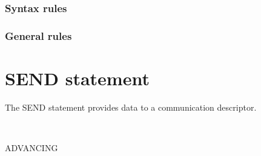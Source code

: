 \subsubsection{Syntax rules}

\subsubsection{General rules}

\section{SEND statement}

The SEND statement provides data to a communication descriptor.

\begin{syntax}[\deletedcolour]
\end{syntax}

\begin{syntax}[\deletedcolour]

  \begin{0-1}
    \begin{1=}
       \\
    \end{1=}
    ADVANCING
    \begin{1=}
      \begin{1=}
        \identifier \\
        \literal
      \end{1=}
      \begin{0-1}
         \\
      \end{0-1} \\

      \mnemonicname \\

    \end{1=}
  \end{0-1}

\end{syntax}

